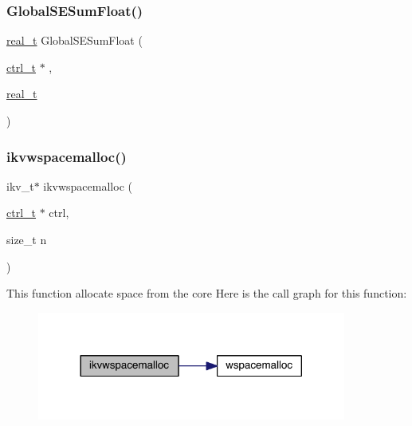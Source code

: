 \mbox{\label{a00951_a02a5f149269a1f4e918148d4801d0618}} 
\subsubsection{\texorpdfstring{Global\+S\+E\+Sum\+Float()}{GlobalSESumFloat()}}
{\footnotesize\ttfamily \hyperlink{a00876_a1924a4f6907cc3833213aba1f07fcbe9}{real\+\_\+t} Global\+S\+E\+Sum\+Float (\begin{DoxyParamCaption}\item[{\hyperlink{a00742}{ctrl\+\_\+t} $\ast$}]{,  }\item[{\hyperlink{a00876_a1924a4f6907cc3833213aba1f07fcbe9}{real\+\_\+t}}]{ }\end{DoxyParamCaption})}

\mbox{\label{a00951_accf7db8ecb7288f18eaf02d58cbb1244}} 
\subsubsection{\texorpdfstring{ikvwspacemalloc()}{ikvwspacemalloc()}}
{\footnotesize\ttfamily ikv\+\_\+t$\ast$ ikvwspacemalloc (\begin{DoxyParamCaption}\item[{\hyperlink{a00742}{ctrl\+\_\+t} $\ast$}]{ctrl,  }\item[{size\+\_\+t}]{n }\end{DoxyParamCaption})}

This function allocate space from the core Here is the call graph for this function\+:\nopagebreak
\begin{figure}[H]
\begin{center}
\leavevmode
\includegraphics[width=288pt]{a00951_accf7db8ecb7288f18eaf02d58cbb1244_cgraph}
\end{center}
\end{figure}
\mbox{\label{a00951_a69b67f828387abb4ad1f33eed8f72d13}} 
